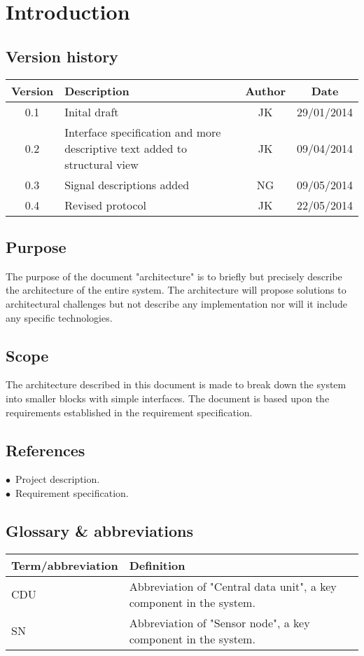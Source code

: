 \chapter{Introduction}
\section{Version history}
\begin{table}[H]
\begin{tabular}{|c|p{9cm}|c|c|}
\hline
Version & Description & Author & Date\\
\hline
0.1 & Inital draft & JK & 29/01/2014\\
\hline
0.2 & Interface specification and more descriptive text added to structural view & JK & 09/04/2014\\ \hline
0.3 & Signal descriptions added & NG & 09/05/2014\\ \hline
0.4 & Revised protocol & JK & 22/05/2014\\ \hline
\end{tabular}
\end{table}

\section{Purpose}
The purpose of the document "architecture" is to briefly but precisely describe the architecture of the entire system. The architecture will propose solutions to architectural challenges but not describe any implementation nor will it include any specific technologies.

\section{Scope}
The architecture described in this document is made to break down the system into smaller blocks with simple interfaces. The document is based upon the requirements established in the requirement specification.

\section{References}
$\bullet$\ Project description.\\
$\bullet$\ Requirement specification.\\



\section{Glossary \& abbreviations}
\begin{table}[H]
\centering
\begin{tabular}{|p{4cm}|p{7cm}|}
\hline
Term/abbreviation & Definition\\ \hline
CDU & Abbreviation of "Central data unit", a key component in the system.\\ \hline
SN & Abbreviation of "Sensor node", a key component in the system.\\ \hline
\end{tabular}
\end{table}
